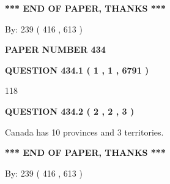 \documentclass[12pt]{article}
\begin{document}
   
   
\vspace{1.0in} 
{\textbf{\large{ *** END OF PAPER, THANKS *** }}} 
   
   
\hspace{1.0in} By: 
 239 ( 416 ,  613 )
   
   
   
   
\newpage 
\setcounter{page}{ 
   434001 } 
   
   
   
   
 {\textbf{ \Large{ PAPER NUMBER  434  }}}
   
   
\vspace{0.2in}
   
   
   
   
   
   
 \vspace{0.2in}
 
 
 
 
   
   
  
\vspace{0.2in}
  
{\textbf{\Large{QUESTION
434.1 
 ( 1 , 1 , 6791 )
}}}
  
  
 
 
\noindent{}

118
 
 
  
\vspace{0.2in}
  
{\textbf{\Large{QUESTION
434.2 
 ( 2 , 2 , 3 )
}}}
  
  
 
 
\noindent{}
 
 
Canada has 10  provinces and 3 territories.
 
 
 
 
   
   
 \vspace{0.2in}
 
   
   
   
   
\vspace{1.0in} 
{\textbf{\large{ *** END OF PAPER, THANKS *** }}} 
   
   
\hspace{1.0in} By: 
 239 ( 416 ,  613 )
   
\end{document}
